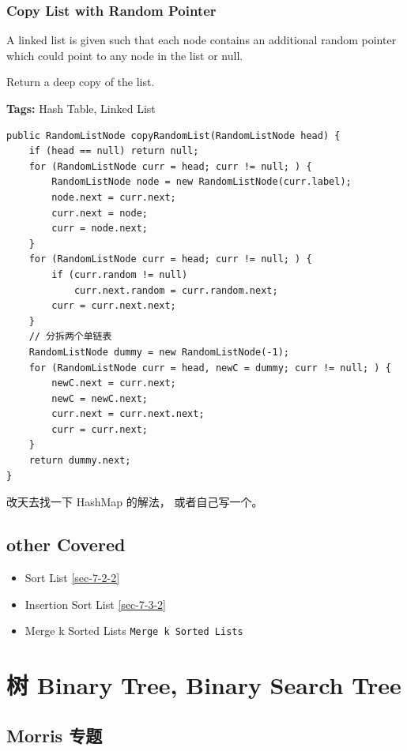 \documentclass[12pt]{book}
\begin{document}
\subsection{Copy List with Random Pointer}
\label{sec-3-3-2}

A linked list is given such that each node contains an additional random pointer which could point to any node in the list or null.

Return a deep copy of the list.

\textbf{Tags:} Hash Table, Linked List

\lstset{language=java,label= ,caption= ,numbers=none}
\begin{lstlisting}
public RandomListNode copyRandomList(RandomListNode head) {
    if (head == null) return null;
    for (RandomListNode curr = head; curr != null; ) {
        RandomListNode node = new RandomListNode(curr.label);
        node.next = curr.next;
        curr.next = node;
        curr = node.next;
    }
    for (RandomListNode curr = head; curr != null; ) {
        if (curr.random != null)
            curr.next.random = curr.random.next;
        curr = curr.next.next;
    }
    // 分拆两个单链表
    RandomListNode dummy = new RandomListNode(-1);
    for (RandomListNode curr = head, newC = dummy; curr != null; ) {
        newC.next = curr.next;
        newC = newC.next;
        curr.next = curr.next.next;
        curr = curr.next;
    }
    return dummy.next;
}
\end{lstlisting}

改天去找一下 HashMap 的解法， 或者自己写一个。

\section{other Covered}
\label{sec-3-4}
\begin{itemize}
\item Sort List
\ref{sec-7-2-2}
\item Insertion Sort List
\ref{sec-7-3-2}
\item Merge k Sorted Lists
\texttt{Merge k Sorted Lists}
\end{itemize}
\chapter{树 Binary Tree, Binary Search Tree}
\label{sec-4}
\section{Morris 专题}
\label{sec-4-1}
\end{document}
